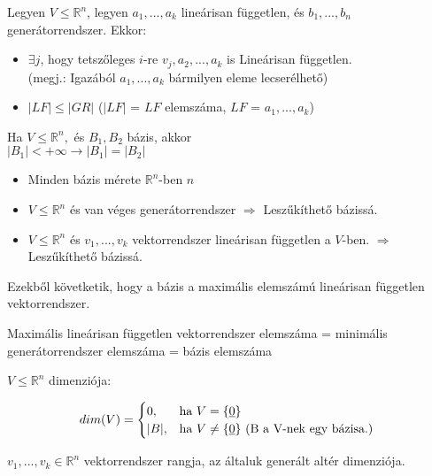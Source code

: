 	\begin{frame}
		\begin{tcolorbox}[title={Tétel: Kicserélési tétel}]
			Legyen $V \leq \mathbb{R}^n$, legyen $a_1, ..., a_k$ lineárisan független, és $b_1, ..., b_n$ generátorrendszer. Ekkor:\\
			\begin{itemize}
				\item $\exists j$, hogy tetszőleges $i$-re $v_j, a_2, ..., a_k$ is Lineárisan független.\\
				(megj.: Igazából $a_1, ..., a_k$ bármilyen eleme lecserélhető)
				\item $|LF| \leq |GR|$ ($|LF|$ = $LF$ elemszáma, $LF$ = $a_1, ..., a_k$)
			\end{itemize}
		\end{tcolorbox}
		
		\begin{tcolorbox}[title={Tétel.: Bázis}]
			Ha $V \leq \mathbb{R}^n,$ és $B_1, B_2$ bázis, akkor\\
			$|B_1| < + \infty \rightarrow |B_1| = |B_2|$
		\end{tcolorbox}
		
		\begin{tcolorbox}[title={Bázis}]
			\begin{itemize}			
				\item Minden bázis mérete $\mathbb{R}^n$-ben $n$
				\item $V \leq \mathbb{R}^n$ és van véges generátorrendszer $\Rightarrow$ Leszűkíthető bázissá.
				\item $V \leq \mathbb{R}^n$ és $v_1, ..., v_k$ vektorrendszer lineárisan független a $V$-ben. $\Rightarrow$ Leszűkíthető bázissá.
			\end{itemize}
			\mmedskip
			
			Ezekből követketik, hogy a bázis a maximális elemszámú lineárisan független vektorrendszer.\\
			\mmedskip
			
			Maximális lineárisan független vektorrendszer elemszáma = minimális generátorrendszer elemszáma = bázis elemszáma
		\end{tcolorbox}
		
		\begin{tcolorbox}[title={Def.: Dimenzió}]
			$V \leq \mathbb{R}^n$ dimenziója:\\
			\mmedskip
			
			\[
   				dim(V) = 
			\begin{cases}
   				0,				& \text{ha } V = \{ \underline{0} \}\\
    				|B|,                & \text{ha } V \neq \{ \underline{0} \} \text{ (B a V-nek egy bázisa.) } \\
			\end{cases}
			\]		
		\end{tcolorbox}
		
		\begin{tcolorbox}[title={Def.: Rang}]
			 $v_1, ..., v_k \in \mathbb{R}^n$ vektorrendszer rangja, az általuk generált altér dimenziója.
		\end{tcolorbox}
	\end{frame}
	
